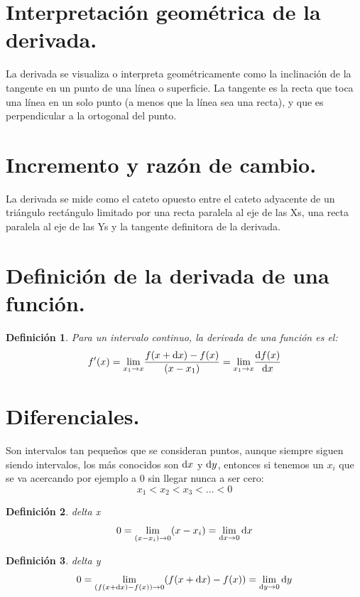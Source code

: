 \documentclass[oneside,spanish,letterpaper]{extbook}
\newtheorem{definition}{Definición}[section]%
\theoremstyle{mythmstyle}
\begin{document}
\section{Interpretación geométrica de la derivada.}
La derivada se visualiza o interpreta geométricamente como la inclinación de la tangente en un punto de una línea o superficie. La tangente es la recta
que toca una línea en un solo punto (a menos que la línea sea una recta), y que es perpendicular a la ortogonal del punto. 
\section{Incremento y razón de cambio.}
 La derivada se mide como el cateto opuesto entre el cateto adyacente de un triángulo rectángulo limitado por 
 una recta paralela al eje de las Xs, una recta paralela al eje de las Ys y la tangente definitora de la derivada. 

\section{Definición de la derivada de una función.}
\begin{definition}\label{der}
Para un intervalo continuo, la derivada de una función es el:
$$f'(x)=\underset{x_1\rightarrow x}{\lim}\frac{f(x+\mathrm{d}x)-f(x)}{(x-x_1)}=\underset{x_1\rightarrow x}{\lim}\frac{\dif f(x)}{\dif x}   $$
\end{definition}

\section{Diferenciales.}
Son intervalos tan pequeños que se consideran puntos, aunque siempre siguen siendo intervalos, los más conocidos son $\dif x$ y $\dif y$, entonces si tenemos un $x_i$ que se va acercando por ejemplo a 0 sin llegar nunca a ser cero:
\begin{equation}
 x_1<x_2<x_3<...<0
\end{equation}

\begin{definition}\label{dx}
 delta x
$$0=\underset{(x-x_i)\rightarrow 0}{\lim}(x-x_i)=\underset{\dif x\rightarrow 0}{\lim}\dif x$$
\end{definition}

\begin{definition}\label{dy}
 delta y
$$0=\underset{(f(x+\mathrm{d}x)-f(x))\rightarrow 0}{\lim}(f(x+\dif x)-f(x))=\underset{ \dif y  \rightarrow 0}{\lim}\dif y  $$
\end{definition}
\end{document}
